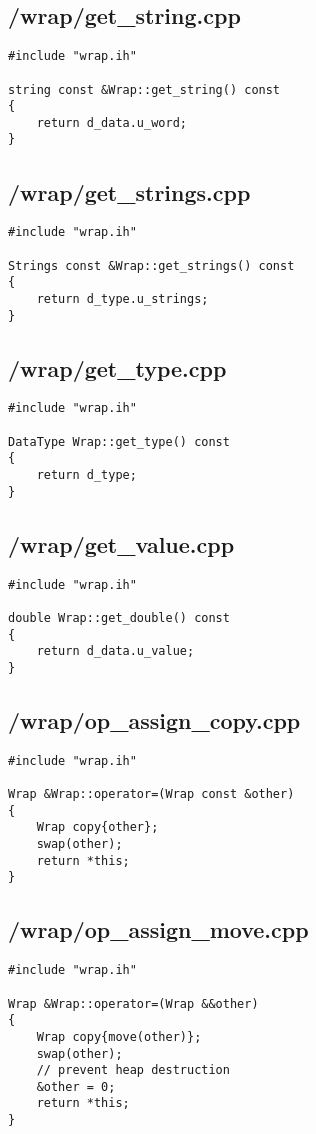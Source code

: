 \documentclass{article}
\begin{document}
\subsection*{/wrap/get\_string.cpp}
\begin{verbatim}
#include "wrap.ih"

string const &Wrap::get_string() const
{
    return d_data.u_word;
}
\end{verbatim}
\subsection*{/wrap/get\_strings.cpp}
\begin{verbatim}
#include "wrap.ih"

Strings const &Wrap::get_strings() const
{
    return d_type.u_strings;
}
\end{verbatim}
\subsection*{/wrap/get\_type.cpp}
\begin{verbatim}
#include "wrap.ih"

DataType Wrap::get_type() const
{
    return d_type;
}
\end{verbatim}
\subsection*{/wrap/get\_value.cpp}
\begin{verbatim}
#include "wrap.ih"

double Wrap::get_double() const
{
    return d_data.u_value;
}
\end{verbatim}
\subsection*{/wrap/op\_assign\_copy.cpp}
\begin{verbatim}
#include "wrap.ih"

Wrap &Wrap::operator=(Wrap const &other)
{
    Wrap copy{other};
    swap(other);
    return *this;
}

\end{verbatim}
\subsection*{/wrap/op\_assign\_move.cpp}
\begin{verbatim}
#include "wrap.ih"

Wrap &Wrap::operator=(Wrap &&other)
{
    Wrap copy{move(other)};
    swap(other);
    // prevent heap destruction
    &other = 0;
    return *this;
}

\end{verbatim}
\end{document}

